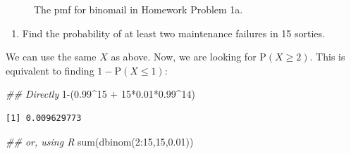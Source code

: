 \documentclass[
  letterpaper,
  DIV=11,
  numbers=noendperiod]{scrreprt}
\newenvironment{Shaded}{\begin{snugshade}}{\end{snugshade}}
\newcommand{\DecValTok}[1]{\textcolor[rgb]{0.68,0.00,0.00}{#1}}
\newcommand{\DocumentationTok}[1]{\textcolor[rgb]{0.37,0.37,0.37}{\textit{#1}}}
\newcommand{\FloatTok}[1]{\textcolor[rgb]{0.68,0.00,0.00}{#1}}
\newcommand{\FunctionTok}[1]{\textcolor[rgb]{0.28,0.35,0.67}{#1}}
\newcommand{\NormalTok}[1]{\textcolor[rgb]{0.00,0.23,0.31}{#1}}
\newcommand{\SpecialCharTok}[1]{\textcolor[rgb]{0.37,0.37,0.37}{#1}}
\providecommand{\tightlist}{%
  \setlength{\itemsep}{0pt}\setlength{\parskip}{0pt}}\usepackage{longtable,booktabs,array}
\begin{document}
\begin{figure}[H]


\caption{\label{fig-hw1a}The pmf for binomail in Homework Problem 1a.}

\end{figure}%

\begin{enumerate}
\def\labelenumi{\alph{enumi}.}
\setcounter{enumi}{1}
\tightlist
\item
  Find the probability of at least two maintenance failures in 15
  sorties.
\end{enumerate}

We can use the same \(X\) as above. Now, we are looking for
\(\mbox{P}(X\geq 2)\). This is equivalent to finding
\(1-\mbox{P}(X\leq 1)\):

\begin{Shaded}
\begin{Highlighting}[]
\DocumentationTok{\#\# Directly}
\DecValTok{1}\SpecialCharTok{{-}}\NormalTok{(}\FloatTok{0.99}\SpecialCharTok{\^{}}\DecValTok{15} \SpecialCharTok{+} \DecValTok{15}\SpecialCharTok{*}\FloatTok{0.01}\SpecialCharTok{*}\FloatTok{0.99}\SpecialCharTok{\^{}}\DecValTok{14}\NormalTok{)}
\end{Highlighting}
\end{Shaded}

\begin{verbatim}
[1] 0.009629773
\end{verbatim}

\begin{Shaded}
\begin{Highlighting}[]
\DocumentationTok{\#\# or, using R}
\FunctionTok{sum}\NormalTok{(}\FunctionTok{dbinom}\NormalTok{(}\DecValTok{2}\SpecialCharTok{:}\DecValTok{15}\NormalTok{,}\DecValTok{15}\NormalTok{,}\FloatTok{0.01}\NormalTok{))}
\end{Highlighting}
\end{Shaded}
\end{document}

